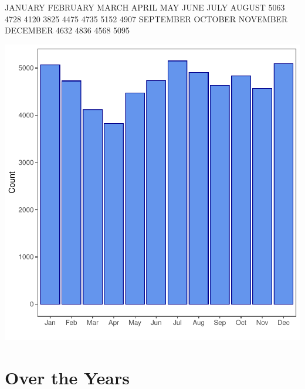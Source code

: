 \documentclass[11pt, a4paper]{article}
\begin{document}
\begin{Schunk}
\begin{Soutput}
  JANUARY  FEBRUARY     MARCH     APRIL       MAY      JUNE      JULY    AUGUST 
     5063      4728      4120      3825      4475      4735      5152      4907 
SEPTEMBER   OCTOBER  NOVEMBER  DECEMBER 
     4632      4836      4568      5095 
\end{Soutput}
\end{Schunk}
\includegraphics{variableinvestigation-004}


\pagebreak
\section{Over the Years}
\end{document}
